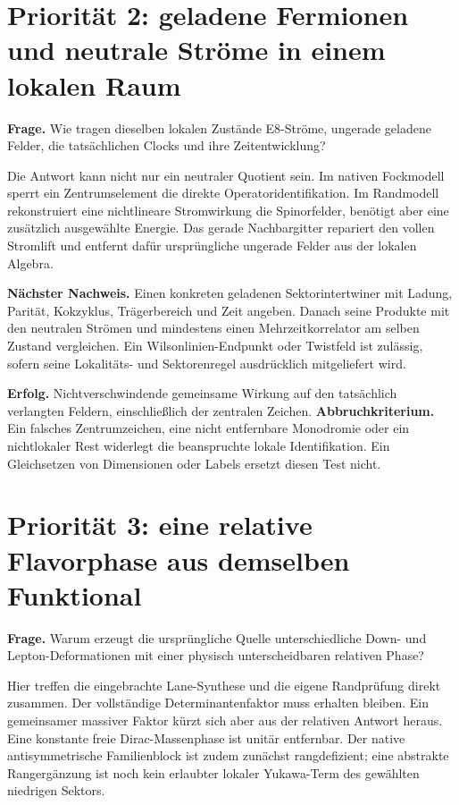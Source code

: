 \section{Priorität 2: geladene Fermionen und neutrale Ströme in einem lokalen Raum}
\textbf{Frage.} Wie tragen dieselben lokalen Zustände E8-Ströme, ungerade geladene Felder, die tatsächlichen Clocks und ihre Zeitentwicklung?

Die Antwort kann nicht nur ein neutraler Quotient sein. Im nativen Fockmodell sperrt ein Zentrumselement die direkte Operatoridentifikation. Im Randmodell rekonstruiert eine nichtlineare Stromwirkung die Spinorfelder, benötigt aber eine zusätzlich ausgewählte Energie. Das gerade Nachbargitter repariert den vollen Stromlift und entfernt dafür ursprüngliche ungerade Felder aus der lokalen Algebra.

\textbf{Nächster Nachweis.} Einen konkreten geladenen Sektorintertwiner mit Ladung, Parität, Kokzyklus, Trägerbereich und Zeit angeben. Danach seine Produkte mit den neutralen Strömen und mindestens einen Mehrzeitkorrelator am selben Zustand vergleichen. Ein Wilsonlinien-Endpunkt oder Twistfeld ist zulässig, sofern seine Lokalitäts- und Sektorenregel ausdrücklich mitgeliefert wird.

\textbf{Erfolg.} Nichtverschwindende gemeinsame Wirkung auf den tatsächlich verlangten Feldern, einschließlich der zentralen Zeichen. \textbf{Abbruchkriterium.} Ein falsches Zentrumzeichen, eine nicht entfernbare Monodromie oder ein nichtlokaler Rest widerlegt die beanspruchte lokale Identifikation. Ein Gleichsetzen von Dimensionen oder Labels ersetzt diesen Test nicht.

\section{Priorität 3: eine relative Flavorphase aus demselben Funktional}
\textbf{Frage.} Warum erzeugt die ursprüngliche Quelle unterschiedliche Down- und Lepton-Deformationen mit einer physisch unterscheidbaren relativen Phase?

Hier treffen die eingebrachte Lane-Synthese und die eigene Randprüfung direkt zusammen. Der vollständige Determinantenfaktor muss erhalten bleiben. Ein gemeinsamer massiver Faktor kürzt sich aber aus der relativen Antwort heraus. Eine konstante freie Dirac-Massenphase ist unitär entfernbar. Der native antisymmetrische Familienblock ist zudem zunächst rangdefizient; eine abstrakte Rangergänzung ist noch kein erlaubter lokaler Yukawa-Term des gewählten niedrigen Sektors.

